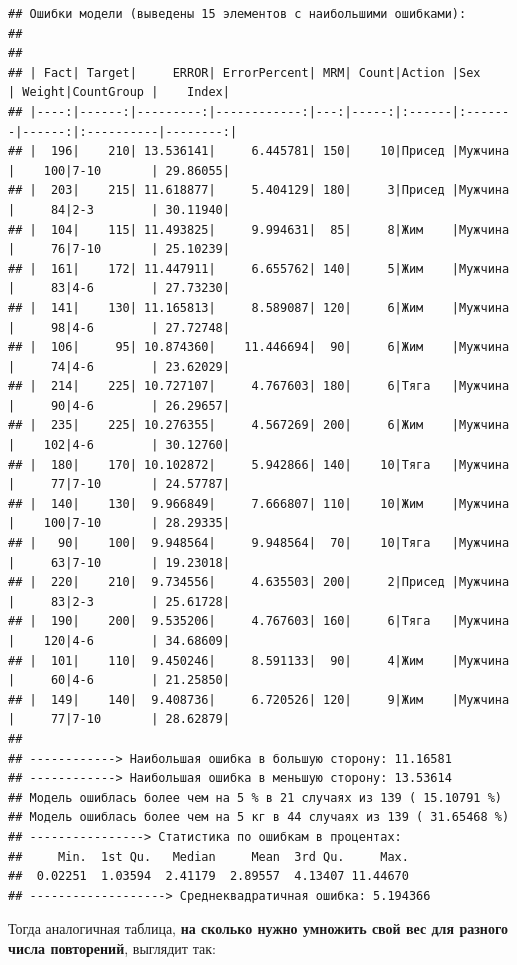 \documentclass[
]{article}
\begin{document}
\begin{verbatim}
## Ошибки модели (выведены 15 элементов с наибольшими ошибками): 
## 
## 
## | Fact| Target|     ERROR| ErrorPercent| MRM| Count|Action |Sex     | Weight|CountGroup |    Index|
## |----:|------:|---------:|------------:|---:|-----:|:------|:-------|------:|:----------|--------:|
## |  196|    210| 13.536141|     6.445781| 150|    10|Присед |Мужчина |    100|7-10       | 29.86055|
## |  203|    215| 11.618877|     5.404129| 180|     3|Присед |Мужчина |     84|2-3        | 30.11940|
## |  104|    115| 11.493825|     9.994631|  85|     8|Жим    |Мужчина |     76|7-10       | 25.10239|
## |  161|    172| 11.447911|     6.655762| 140|     5|Жим    |Мужчина |     83|4-6        | 27.73230|
## |  141|    130| 11.165813|     8.589087| 120|     6|Жим    |Мужчина |     98|4-6        | 27.72748|
## |  106|     95| 10.874360|    11.446694|  90|     6|Жим    |Мужчина |     74|4-6        | 23.62029|
## |  214|    225| 10.727107|     4.767603| 180|     6|Тяга   |Мужчина |     90|4-6        | 26.29657|
## |  235|    225| 10.276355|     4.567269| 200|     6|Жим    |Мужчина |    102|4-6        | 30.12760|
## |  180|    170| 10.102872|     5.942866| 140|    10|Тяга   |Мужчина |     77|7-10       | 24.57787|
## |  140|    130|  9.966849|     7.666807| 110|    10|Жим    |Мужчина |    100|7-10       | 28.29335|
## |   90|    100|  9.948564|     9.948564|  70|    10|Тяга   |Мужчина |     63|7-10       | 19.23018|
## |  220|    210|  9.734556|     4.635503| 200|     2|Присед |Мужчина |     83|2-3        | 25.61728|
## |  190|    200|  9.535206|     4.767603| 160|     6|Тяга   |Мужчина |    120|4-6        | 34.68609|
## |  101|    110|  9.450246|     8.591133|  90|     4|Жим    |Мужчина |     60|4-6        | 21.25850|
## |  149|    140|  9.408736|     6.720526| 120|     9|Жим    |Мужчина |     77|7-10       | 28.62879|
## 
## ------------> Наибольшая ошибка в большую сторону: 11.16581 
## ------------> Наибольшая ошибка в меньшую сторону: 13.53614 
## Модель ошиблась более чем на 5 % в 21 случаях из 139 ( 15.10791 %)
## Модель ошиблась более чем на 5 кг в 44 случаях из 139 ( 31.65468 %)
## ----------------> Статистика по ошибкам в процентах:
##     Min.  1st Qu.   Median     Mean  3rd Qu.     Max. 
##  0.02251  1.03594  2.41179  2.89557  4.13407 11.44670 
## -------------------> Среднеквадратичная ошибка: 5.194366
\end{verbatim}

Тогда аналогичная таблица, \textbf{на сколько нужно умножить свой вес
для разного числа повторений}, выглядит так:
\end{document}
